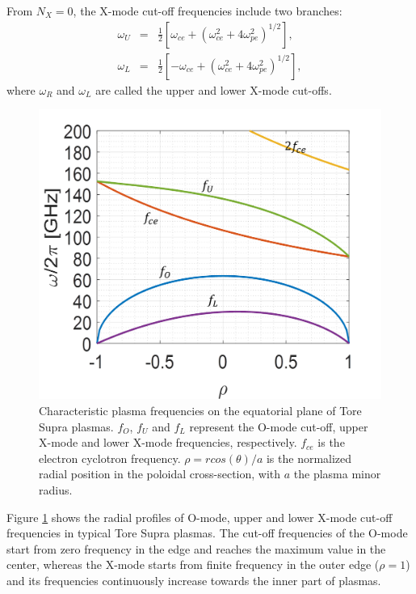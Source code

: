 From $N_X = 0$, the X-mode cut-off frequencies include two branches:%
\begin{eqnarray}
  \omega_U &=& \frac{1}{2}[\omega_{ce}+(\omega_{ce}^2+4\omega_{pe}^2)^{1/2}], \\
  \omega_L &=& \frac{1}{2}[-\omega_{ce}+(\omega_{ce}^2+4\omega_{pe}^2)^{1/2}],
\end{eqnarray}
\noindent where $\omega_R$ and $\omega_L$ are called the upper and lower X-mode cut-offs.


\begin{figure}[h]
\begin{centering}
\includegraphics[scale=0.4]{wave_freq.png}
\par\end{centering}
\caption[Characteristic plasma frequencies]{Characteristic plasma frequencies on the equatorial plane of Tore Supra plasmas. $f_O$, $f_U$ and $f_L$ represent the O-mode cut-off, upper X-mode and lower X-mode frequencies, respectively. $f_{ce}$ is the electron cyclotron frequency. $\rho=rcos(\theta)/a$ is the normalized radial position in the poloidal cross-section, with $a$ the plasma minor radius.}
\label{fig:wave_freq}
\end{figure}

Figure \ref{fig:wave_freq} shows the radial profiles of O-mode, upper and lower X-mode cut-off frequencies in typical Tore Supra plasmas. The cut-off frequencies of the O-mode start from zero frequency in the edge and reaches the maximum value in the center, whereas the X-mode starts from finite frequency in the outer edge ($\rho = 1$) and its frequencies continuously increase towards the inner part of plasmas.


